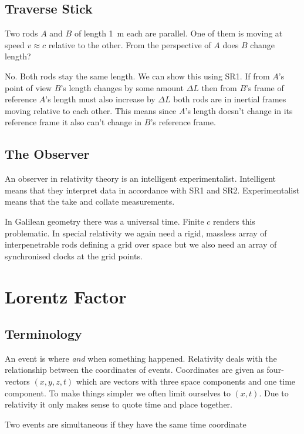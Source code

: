 \documentclass{article}
\begin{document}
    \subsection{Traverse Stick}
    Two rods \(A\) and \(B\) of length \SI{1}{m} each are parallel. One of them is moving at speed \(v\approx c\) relative to the other. From the perspective of \(A\) does \(B\) change length?
    
    No. Both rods stay the same length. We can show this using SR1. If from \(A\)'s point of view \(B\)'s length changes by some amount \(\Delta L\) then from \(B\)'s frame of reference \(A\)'s length must also increase by \(\Delta L\) both rods are in inertial frames moving relative to each other. This means since \(A\)'s length doesn't change in its reference frame it also can't change in \(B\)'s reference frame.
    
    \subsection{The Observer}
    An observer in relativity theory is an intelligent experimentalist. Intelligent means that they interpret data in accordance with SR1 and SR2. Experimentalist means that the take and collate measurements.
    
    In Galilean geometry there was a universal time. Finite \(c\) renders this problematic. In special relativity we again need a rigid, massless array of interpenetrable rods defining a grid over space but we also need an array of synchronised clocks at the grid points.
    
    \section{Lorentz Factor}
    \subsection{Terminology}
    An event is where \emph{and} when something happened. 
    Relativity deals with the relationship between the coordinates of events. 
    Coordinates are given as four-vectors \((x, y, z, t)\) which are vectors with three space components and one time component. 
    To make things simpler we often limit ourselves to \((x, t)\).
    Due to relativity it only makes sense to quote time and place together.
    
    Two events are simultaneous if they have the same time coordinate
    
\end{document}
